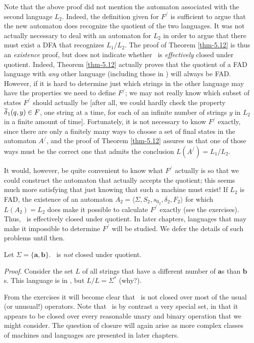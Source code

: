 Note that the above proof did not mention the automaton associated with the
second language $L_2$. Indeed, the definition given for $F^/$ is sufficient to
argue that the new automaton does recognize the quotient of the two languages.
It was not actually necessary to deal with an automaton for $L_2$ in order to
argue that there must exist a DFA that recognizes $L_1/L_2$. The proof of
Theorem \ref{thm-5.12} is thus an \emph{existence} proof, but does not indicate whether
\DSIG\ is \emph{effectively} closed under quotient. Indeed, Theorem \ref{thm-5.12}
actually proves that the quotient of a FAD language with \emph{any} other language
(including those in \NSIG) will always be FAD. However, if it is hard to
determine just which strings in the other language may have the properties we
need to define $F^/$; we may not really know which subset of states $F^/$ should
actually be [after all, we could hardly check the property $\overline{\delta}_1(q,y)\in F$,
one string at a time, for each of an infinite number of strings $y$ in $L_2$ in
a finite amount of time]. Fortunately, it is not necessary to know $F^/$
exactly, since there are only a finitely many ways to choose a set of final
states in the automaton $A^/$, and the proof of Theorem \ref{thm-5.12} assures us that one
of those ways must be the correct one that admits the conclusion
$L(A^/)=L_1/L_2$.

It would, however, be quite convenient to know what $F^/$ actually is so that we
could construct the automaton that actually accepts the quotient; this seems
much more satisfying that just knowing that such a machine must exist! If $L_2$
is FAD, the existence of an automaton
$A_2=\langle\Sigma,S_2,s_{0_2},\delta_2,F_2\rangle$ for which $L(A_2)=L_2$ does
make it possible to calculate $F^/$ exactly (see the exercises). Thus, \DSIG\ is
effectively closed under quotient. In later chapters, languages that may make it
impossible to determine $F^/$ will be studied. We defer the details of such
problems until then.

\begin{lmm}\label{lmm-5.7}
Let $\Sigma=\{\pmb{a},\pmb{b}\}$. \NSIG\ is \emph{not} closed under quotient.

\emph{Proof.} Consider the set $L$ of all strings that have a different number
of $\pmb{a}$s than $\pmb{b}$s. This language is in \NSIG, but $L/L=\Sigma^*$ (why?).
\end{lmm}

From the exercises it will become clear that \NSIG\ is not closed over most of
the usual (or unusual!) operators. Note that \DSIG\ is by contrast a very
special set, in that it appears to be closed over every reasonable unary and
binary operation that we might consider. The question of closure will again
arise as more complex classes of machines and languages are presented in later
chapters.

